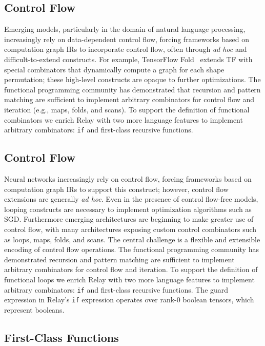 \subsection*{Control Flow}

Emerging models, particularly in the domain of natural language processing, increasingly
  rely on data-dependent control flow, forcing frameworks based on computation graph IRs
  to incorporate control flow, often through \textit{ad hoc} and difficult-to-extend constructs.
For example, TensorFlow Fold~\citep{tf_fold} extends TF with special combinators that
  dynamically compute a graph for each shape permutation;
  these high-level constructs are opaque to further optimizations.
The functional programming community has demonstrated that recursion and pattern matching are sufficient
  to implement arbitrary combinators for control flow and iteration (e.g., maps, folds, and scans).
To support the definition of functional combinators
  we enrich Relay with two more language
  features to implement arbitrary combinators: \verb|if| and first-class recursive functions.

\subsection{Control Flow}

Neural networks increasingly rely on control flow, forcing frameworks based on computation graph IRs
to support this construct; however, control flow extensions are generally \textit{ad hoc}.
Even in the presence of control flow-free models, looping
  constructs are necessary to implement optimization algorithms
  such as SGD.
Furthermore emerging architectures are beginning to make greater use of
    control flow, with many architectures exposing custom control
    combinators such as loops, maps, folds, and scans.
The central challenge is a flexible and extensible encoding of
  control flow operations.
The functional programming community has demonstrated recursion and pattern matching are sufficient
  to implement arbitrary combinators for control flow and iteration.
To support the definition of functional loops we enrich Relay with two more language
  features to implement arbitrary combinators: \verb|if| and first-class recursive functions.
The guard expression in Relay's \verb|if| expression operates over rank-0 boolean tensors,
  which represent booleans.

\subsection*{First-Class Functions}

